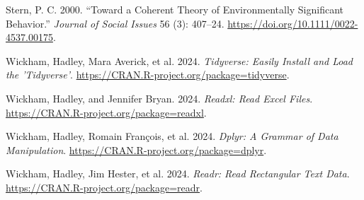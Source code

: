 \documentclass[
  letterpaper,
  DIV=11,
  numbers=noendperiod]{scrartcl}
\newlength{\cslhangindent}
\newenvironment{CSLReferences}[2] %
 {\begin{list}{}{%
  \setlength{\itemindent}{0pt}
  \setlength{\leftmargin}{0pt}
  \setlength{\parsep}{0pt}
  \ifodd #1
   \setlength{\leftmargin}{\cslhangindent}
   \setlength{\itemindent}{-1\cslhangindent}
  \fi
  \setlength{\itemsep}{#2\baselineskip}}}
 {\end{list}}
\begin{document}
\begin{CSLReferences}{1}{0}
Stern, P. C. 2000. {``Toward a Coherent Theory of Environmentally
Significant Behavior.''} \emph{Journal of Social Issues} 56 (3):
407--24. \url{https://doi.org/10.1111/0022-4537.00175}.

Wickham, Hadley, Mara Averick, et al. 2024. \emph{Tidyverse: Easily
Install and Load the 'Tidyverse'}.
\url{https://CRAN.R-project.org/package=tidyverse}.

Wickham, Hadley, and Jennifer Bryan. 2024. \emph{Readxl: Read Excel
Files}. \url{https://CRAN.R-project.org/package=readxl}.

Wickham, Hadley, Romain François, et al. 2024. \emph{Dplyr: A Grammar of
Data Manipulation}. \url{https://CRAN.R-project.org/package=dplyr}.

Wickham, Hadley, Jim Hester, et al. 2024. \emph{Readr: Read Rectangular
Text Data}. \url{https://CRAN.R-project.org/package=readr}.

\end{CSLReferences}
\end{document}
